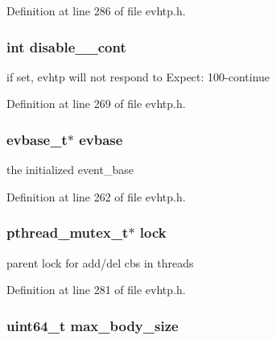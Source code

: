 \-Definition at line 286 of file evhtp.\-h.

\hypertarget{structevhtp__s_a806a6ea42290c69038c482e6a266db12}{
\subsubsection[{disable\-\_\-100\-\_\-cont}]{\setlength{\rightskip}{0pt plus 5cm}int {\bf disable\-\_\-\_\-cont}}}\label{structevhtp__s_a806a6ea42290c69038c482e6a266db12}
if set, evhtp will not respond to \-Expect\-: 100-\/continue 

\-Definition at line 269 of file evhtp.\-h.

\hypertarget{structevhtp__s_abc4ce26b166a97e5766105f253a4fe21}{
\subsubsection[{evbase}]{\setlength{\rightskip}{0pt plus 5cm}evbase\-\_\-t$\ast$ {\bf evbase}}}\label{structevhtp__s_abc4ce26b166a97e5766105f253a4fe21}
the initialized event\-\_\-base 

\-Definition at line 262 of file evhtp.\-h.

\hypertarget{structevhtp__s_a33586b4184d23f2b8f4df153ec23af13}{
\subsubsection[{lock}]{\setlength{\rightskip}{0pt plus 5cm}pthread\-\_\-mutex\-\_\-t$\ast$ {\bf lock}}}\label{structevhtp__s_a33586b4184d23f2b8f4df153ec23af13}
parent lock for add/del cbs in threads 

\-Definition at line 281 of file evhtp.\-h.

\hypertarget{structevhtp__s_ac0c51866465cd3ccc68751b0ce806cbc}{
\subsubsection[{max\-\_\-body\-\_\-size}]{\setlength{\rightskip}{0pt plus 5cm}uint64\-\_\-t {\bf max\-\_\-body\-\_\-size}}}\label{structevhtp__s_ac0c51866465cd3ccc68751b0ce806cbc}


